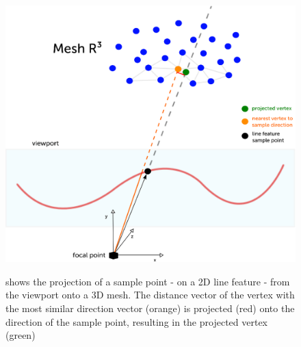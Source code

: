 \begin{figure}[h!]
    \includegraphics[width=\textwidth]{./resources/figures/projection.eps}
\label{fig:projectio}
\caption{shows the projection of a sample point - on a 2D line feature - from the viewport onto a 3D mesh. The distance vector of the vertex with the most similar direction vector (orange) is projected (red) onto the direction of the sample point, resulting in the projected vertex (green)}
\end{figure}

